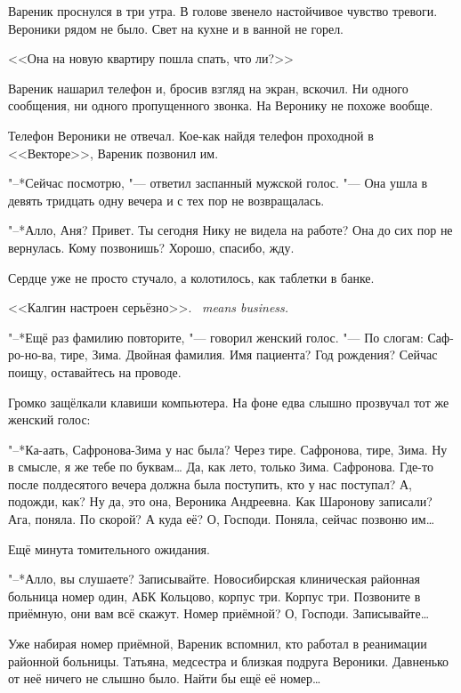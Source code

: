 \asterism

\label{Mon_2012_06_11}

Вареник проснулся в три утра.
В голове звенело настойчивое чувство тревоги.
Вероники рядом не было.
Свет на кухне и в ванной не горел.

<<Она на новую квартиру пошла спать, что ли?>>

Вареник нашарил телефон и, бросив взгляд на экран, вскочил.
Ни одного сообщения, ни одного пропущенного звонка.
На Веронику не похоже вообще.

Телефон Вероники не отвечал.
Кое-как найдя телефон проходной в <<Векторе>>, Вареник позвонил им.

"--*Сейчас посмотрю, "--- ответил заспанный мужской голос.
"--- Она ушла в девять тридцать одну вечера и с тех пор не возвращалась.

"--*Алло, Аня?
Привет.
Ты сегодня Нику не видела на работе?
Она до сих пор не вернулась.
Кому позвонишь?
Хорошо, спасибо, жду.

Сердце уже не просто стучало, а колотилось, как таблетки в банке.

{<<Калгин настроен серьёзно>>.}
{\textit{\Kalgin\ means business.}}

"--*Ещё раз фамилию повторите, "--- говорил женский голос.
"--- По слогам: Саф-ро-но-ва, тире, Зима.
Двойная фамилия.
Имя пациента?
Год рождения?
Сейчас поищу, оставайтесь на проводе.

Громко защёлкали клавиши компьютера.
На фоне едва слышно прозвучал тот же женский голос:

"--*Ка-аать, Сафронова-Зима у нас была?
Через тире.
Сафронова, тире, Зима.
Ну в смысле, я же тебе по буквам\ldots{}
Да, как лето, только Зима.
Сафронова.
Где-то после полдесятого вечера должна была поступить, кто у нас поступал?
А, подожди, как?
Ну да, это она, Вероника Андреевна.
Как Шаронову записали?
Ага, поняла.
По скорой?
А куда её?
О, Господи.
Поняла, сейчас позвоню им\ldots{}

Ещё минута томительного ожидания.

"--*Алло, вы слушаете?
Записывайте.
Новосибирская клиническая районная больница номер один, АБК Кольцово, корпус три.
Корпус три.
Позвоните в приёмную, они вам всё скажут.
Номер приёмной?
О, Господи.
Записывайте\ldots{}

Уже набирая номер приёмной, Вареник вспомнил, кто работал в реанимации районной больницы.
Татьяна, медсестра и близкая подруга Вероники.
Давненько от неё ничего не слышно было.
Найти бы ещё её номер\ldots{}

